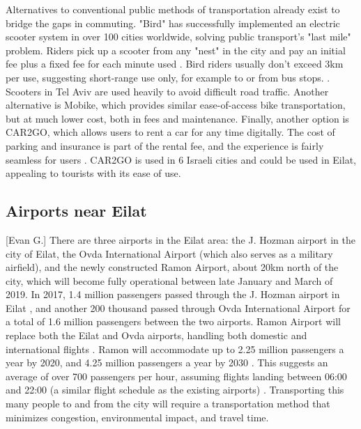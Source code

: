 \documentclass[12pt]{article}                         %
\begin{document}
Alternatives to conventional public methods of transportation already exist to bridge the gaps in commuting. "Bird" has successfully implemented an electric scooter system in over 100 cities worldwide, solving public transport's "last mile" problem. Riders pick up a scooter from any "nest" in the city and pay an initial fee plus a fixed fee for each minute used \cite{MichaelRaz-Chaimovich2018BirdGlobes}. Bird riders usually don't exceed 3km per use, suggesting short-range use only, for example to or from bus stops. \cite{MichaelRaz-Chaimovich2018BirdGlobes}. Scooters in Tel Aviv are used heavily to avoid difficult road traffic. Another alternative is Mobike, which provides similar ease-of-access bike transportation, but at much lower cost, both in fees and maintenance. Finally, another option is CAR2GO, which allows users to rent a car for any time digitally. The cost of parking and insurance is part of the rental fee, and the experience is fairly seamless for users \cite{OrenDoriandMeiravMoran2018IsraeliHaaretz.com}. CAR2GO is used in 6 Israeli cities and could be used in Eilat, appealing to tourists with its ease of use.

\subsection{Airports near Eilat}[Evan G.]
There are three airports in the Eilat area: the J. Hozman airport in the city of Eilat, the Ovda International Airport (which also serves as a military airfield), and the newly constructed Ramon Airport, about 20km north of the city, which will become fully operational between late January and March of 2019. In 2017, 1.4 million passengers passed through the J. Hozman airport in Eilat \cite{IsraeliAirportAuthorityIsraeliAirports}, and another 200 thousand passed through Ovda International Airport \cite{IsraeliAirportAuthorityIsraeliAirports} for a total of 1.6 million passengers between the two airports. Ramon Airport will replace both the Eilat and Ovda airports, handling both domestic and international flights \cite{TimesofIsrealIsraelsOpen}. Ramon will accommodate up to 2.25 million passengers a year by 2020, and 4.25 million passengers a year by 2030 \cite{IsraeliAirportAuthorityIsraeliAirports}. This suggests an average of over 700 passengers per hour, assuming flights landing between 06:00 and 22:00 (a similar flight schedule as the existing airports) \cite{IsraeliAirportAuthorityIsraeliAirports}. Transporting this many people to and from the city will require a transportation method that minimizes congestion, environmental impact, and travel time.
\end{document}
